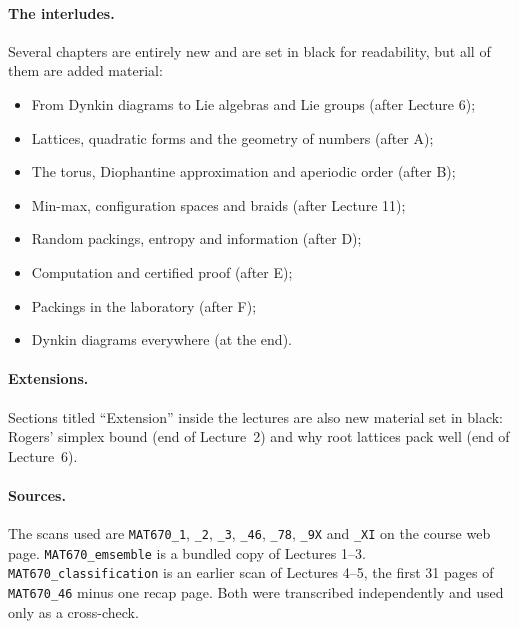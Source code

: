 \paragraph{The interludes.} Several chapters are entirely new and are set in black for readability, but
all of them are added material:
\begin{itemize}
\item[A] From Dynkin diagrams to Lie algebras and Lie groups (after Lecture 6);
\item[B] Lattices, quadratic forms and the geometry of numbers (after A);
\item[C] The torus, Diophantine approximation and aperiodic order (after B);
\item[D] Min-max, configuration spaces and braids (after Lecture 11);
\item[E] Random packings, entropy and information (after D);
\item[F] Computation and certified proof (after E);
\item[G] Packings in the laboratory (after F);
\item[H] Dynkin diagrams everywhere (at the end).
\end{itemize}

\paragraph{Extensions.} Sections titled ``Extension'' inside the lectures are also new material set in
black: Rogers' simplex bound (end of Lecture~2) and why root lattices pack well (end of Lecture~6).

\paragraph{Sources.} The scans used are \texttt{MAT670\_1}, \texttt{\_2}, \texttt{\_3},
\texttt{\_46}, \texttt{\_78}, \texttt{\_9X} and \texttt{\_XI} on the course web page.
\texttt{MAT670\_emsemble} is a bundled copy of Lectures 1--3.
\texttt{MAT670\_classification} is an earlier scan of Lectures 4--5, the first 31 pages of
\texttt{MAT670\_46} minus one recap page. Both were transcribed independently and used only as a
cross-check.

